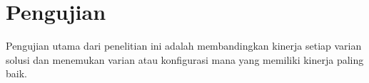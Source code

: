 \section{Pengujian}
\label{sec:pengujian}

Pengujian utama dari penelitian ini adalah membandingkan kinerja setiap varian solusi dan menemukan varian atau konfigurasi mana yang memiliki kinerja paling baik.












